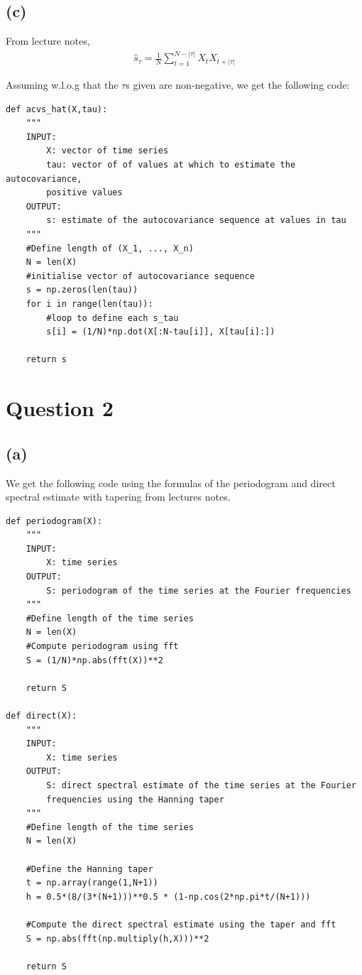 \documentclass[a4paper,10pt]{article}
\theoremstyle{mytheor}
\begin{document}
\subsection*{(c)}

From lecture notes, 
\begin{align*}
    \hat{s}_\tau = \frac{1}{N} \sum_{t = 1} ^{N- |\tau|} X_t X_{t + |\tau|}
\end{align*}

Assuming w.l.o.g that the $\tau$s given are non-negative, we get the following code:

\begin{lstlisting}
def acvs_hat(X,tau):
    """
    INPUT:
        X: vector of time series
        tau: vector of of values at which to estimate the autocovariance,
        positive values
    OUTPUT:
        s: estimate of the autocovariance sequence at values in tau
    """
    #Define length of (X_1, ..., X_n)
    N = len(X)
    #initialise vector of autocovariance sequence
    s = np.zeros(len(tau))
    for i in range(len(tau)):
        #loop to define each s_tau
        s[i] = (1/N)*np.dot(X[:N-tau[i]], X[tau[i]:])
    
    return s
\end{lstlisting}
\clearpage

\section*{Question 2}

\subsection*{(a)}

We get the following code using the formulas of the periodogram and direct spectral estimate with tapering from lectures notes.

\begin{lstlisting}
def periodogram(X):
    """
    INPUT:
        X: time series
    OUTPUT:
        S: periodogram of the time series at the Fourier frequencies
    """
    #Define length of the time series
    N = len(X)
    #Compute periodogram using fft
    S = (1/N)*np.abs(fft(X))**2
    
    return S

def direct(X):
    """
    INPUT:
        X: time series
    OUTPUT:
        S: direct spectral estimate of the time series at the Fourier 
        frequencies using the Hanning taper 
    """
    #Define length of the time series
    N = len(X)
    
    #Define the Hanning taper
    t = np.array(range(1,N+1))
    h = 0.5*(8/(3*(N+1)))**0.5 * (1-np.cos(2*np.pi*t/(N+1)))
    
    #Compute the direct spectral estimate using the taper and fft
    S = np.abs(fft(np.multiply(h,X)))**2
    
    return S
\end{lstlisting}
\end{document}
